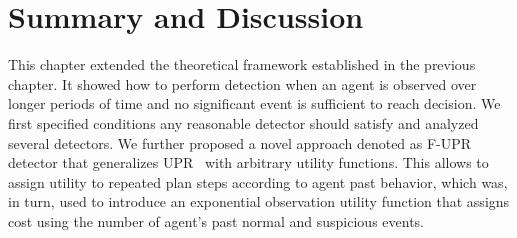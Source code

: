 
\section{Summary and Discussion}
This chapter extended the theoretical framework established in the previous chapter. It showed how to perform detection when an agent is observed over longer periods of time and no significant event is sufficient to reach decision. We first specified conditions any reasonable detector should satisfy and analyzed several detectors. We further proposed a novel approach denoted as F-UPR detector that generalizes UPR~\citep{Avrahami-Zilberbrand2007} with arbitrary utility functions. This allows to assign utility to repeated plan steps according to agent past behavior, which was, in turn, used to introduce an exponential observation utility function that assigns cost using the number of agent's past normal and suspicious events.



